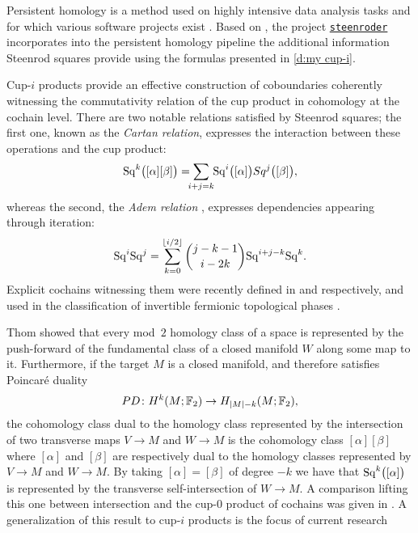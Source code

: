 \begin{remark*}
	Persistent homology is a method used on highly intensive data analysis tasks \cite{carlsson2008images, chan2013viral, lee2017quantifying} and for which various software projects exist \cite{bauer2021ripser, gudhi, medina2021giotto}.
	Based on \cite{medina2021per_st}, the project \href{https://github.com/Steenroder/steenroder}{\texttt{steenroder}} incorporates into the persistent homology pipeline the additional information Steenrod squares provide using the formulas presented in \cref{d:my cup-i}.
\end{remark*}

\begin{remark*}[Relations]
	Cup-$i$ products provide an effective construction of coboundaries coherently witnessing the commutativity relation of the cup product in cohomology at the cochain level.
	There are two notable relations satisfied by Steenrod squares;
	the first one, known as the \textit{Cartan relation}, expresses the interaction between these operations and the cup product:
	\begin{equation*}
	\Sq^k \big( [\alpha] [\beta] \big) =
	\sum_{\mathclap{i+j=k}} \, \Sq^i\big([\alpha]\big) Sq^j\big([\beta]\big),
	\end{equation*}
	whereas the second, the \textit{Adem relation} \cite{adem1952iteration}, expresses dependencies appearing through iteration:
	\begin{equation*}
	\mathrm{Sq}^i \mathrm{Sq}^j =
	\sum_{k=0}^{\lfloor i/2 \rfloor} \binom{j-k-1}{i-2k} \mathrm{Sq}^{i+j-k} \mathrm{Sq}^k.
	\end{equation*}
	Explicit cochains witnessing them were recently defined in \cite{medina2020cartan} and \cite{medina2021adem} respectively, and used in the classification of invertible fermionic topological phases \cite{kapustin2017fermionic, barkeshli2021classification}.
\end{remark*}

\begin{remark*}
	Thom showed that every mod~$2$ homology class of a space is represented by the push-forward of the fundamental class of a closed manifold $W$ along some map to it.
	Furthermore, if the target $M$ is a closed manifold, and therefore satisfies Poincar\'{e} duality
	\[
	PD \colon H^k(M ;{\mathbb{F}_2}) \to H_{\lvert M\rvert-k}(M; {\mathbb{F}_2}),
	\]
	the cohomology class dual to the homology class represented by the intersection of two transverse maps $V \to M$ and $W \to M$ is the cohomology class $[\alpha] [\beta]$ where $[\alpha]$ and $[\beta]$ are respectively dual to the homology classes represented by $V \to M$ and $W \to M$.
	By taking $[\alpha] = [\beta]$ of degree $-k$ we have that $\mathrm{Sq}^k \big( [\alpha] \big)$ is represented by the transverse self-intersection of $W \to M$.
	A comparison lifting this one between intersection and the cup-$0$ product of cochains was given in \cite{medina2021flowing}.
	A generalization of this result to \mbox{cup-$i$} products is the focus of current research \cite{medina2022foundations}
\end{remark*}